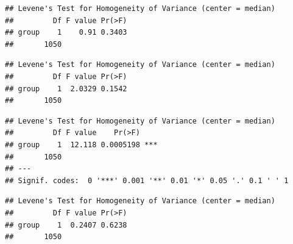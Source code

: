 \documentclass[
]{article}
\newenvironment{Shaded}{\begin{snugshade}}{\end{snugshade}}
\newcommand{\DataTypeTok}[1]{\textcolor[rgb]{0.13,0.29,0.53}{#1}}
\newcommand{\KeywordTok}[1]{\textcolor[rgb]{0.13,0.29,0.53}{\textbf{#1}}}
\newcommand{\NormalTok}[1]{#1}
\newcommand{\OperatorTok}[1]{\textcolor[rgb]{0.81,0.36,0.00}{\textbf{#1}}}
\newcommand{\StringTok}[1]{\textcolor[rgb]{0.31,0.60,0.02}{#1}}
\begin{document}
\begin{verbatim}
## Levene's Test for Homogeneity of Variance (center = median)
##         Df F value Pr(>F)
## group    1    0.91 0.3403
##       1050
\end{verbatim}

\begin{Shaded}
\end{Shaded}

\begin{verbatim}
## Levene's Test for Homogeneity of Variance (center = median)
##         Df F value Pr(>F)
## group    1  2.0329 0.1542
##       1050
\end{verbatim}

\begin{Shaded}
\end{Shaded}

\begin{verbatim}
## Levene's Test for Homogeneity of Variance (center = median)
##         Df F value    Pr(>F)    
## group    1  12.118 0.0005198 ***
##       1050                      
## ---
## Signif. codes:  0 '***' 0.001 '**' 0.01 '*' 0.05 '.' 0.1 ' ' 1
\end{verbatim}

\begin{Shaded}
\end{Shaded}

\begin{verbatim}
## Levene's Test for Homogeneity of Variance (center = median)
##         Df F value Pr(>F)
## group    1  0.2407 0.6238
##       1050
\end{verbatim}
\end{document}

